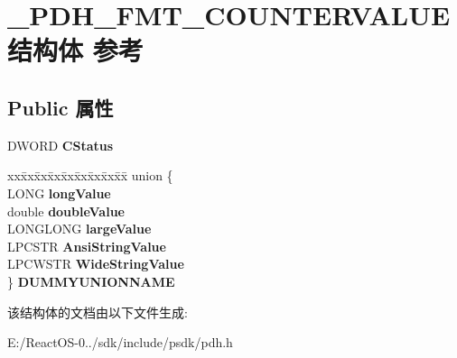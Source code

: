 \hypertarget{struct___p_d_h___f_m_t___c_o_u_n_t_e_r_v_a_l_u_e}{}\section{\+\_\+\+P\+D\+H\+\_\+\+F\+M\+T\+\_\+\+C\+O\+U\+N\+T\+E\+R\+V\+A\+L\+U\+E结构体 参考}
\label{struct___p_d_h___f_m_t___c_o_u_n_t_e_r_v_a_l_u_e}
\subsection*{Public 属性}
\begin{DoxyCompactItemize}
\item 
\mbox{\label{struct___p_d_h___f_m_t___c_o_u_n_t_e_r_v_a_l_u_e_a264f7f1cd87ab5aec81ea3427ec8a7be}} 
D\+W\+O\+RD {\bfseries C\+Status}
\item 
\mbox{\label{struct___p_d_h___f_m_t___c_o_u_n_t_e_r_v_a_l_u_e_ae3b47f8dd4419810c1def12bec544a0d}} 
\begin{tabbing}
xx\=xx\=xx\=xx\=xx\=xx\=xx\=xx\=xx\=\kill
union \{\\
\>LONG {\bfseries longValue}\\
\>double {\bfseries doubleValue}\\
\>LONGLONG {\bfseries largeValue}\\
\>LPCSTR {\bfseries AnsiStringValue}\\
\>LPCWSTR {\bfseries WideStringValue}\\
\} {\bfseries DUMMYUNIONNAME}\\

\end{tabbing}\end{DoxyCompactItemize}


该结构体的文档由以下文件生成\+:\begin{DoxyCompactItemize}
\item 
E\+:/\+React\+O\+S-\/0../sdk/include/psdk/pdh.\+h\end{DoxyCompactItemize}
